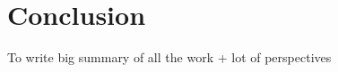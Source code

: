 
\chapter{Conclusion} %

\label{ch:conclusion} %


To write big summary of all the work + lot of perspectives
